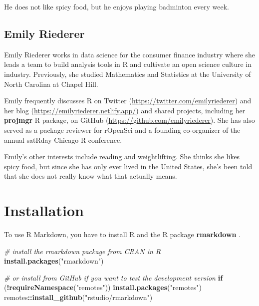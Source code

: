 \documentclass[
  11pt,
]{krantz}
\newenvironment{Shaded}{\begin{snugshade}}{\end{snugshade}}
\newcommand{\CommentTok}[1]{\textcolor[rgb]{0.37,0.37,0.37}{\textit{#1}}}
\newcommand{\ControlFlowTok}[1]{\textcolor[rgb]{0.27,0.27,0.27}{\textbf{#1}}}
\newcommand{\KeywordTok}[1]{\textcolor[rgb]{0.27,0.27,0.27}{\textbf{#1}}}
\newcommand{\NormalTok}[1]{#1}
\newcommand{\OperatorTok}[1]{\textcolor[rgb]{0.43,0.43,0.43}{\textbf{#1}}}
\newcommand{\StringTok}[1]{\textcolor[rgb]{0.5,0.5,0.5}{#1}}
\begin{document}
He does not like spicy food, but he enjoys playing badminton every week.

\hypertarget{emily-riederer}{%
\section*{Emily Riederer}\label{emily-riederer}}


Emily Riederer works in data science for the consumer finance industry where she leads a team to build analysis tools in R and cultivate an open science culture in industry. Previously, she studied Mathematics and Statistics at the University of North Carolina at Chapel Hill.

Emily frequently discusses R on Twitter (\url{https://twitter.com/emilyriederer}) and her blog (\url{https://emilyriederer.netlify.app/}) and shared projects, including her \textbf{projmgr} R package, on GitHub (\url{https://github.com/emilyriederer}). She has also served as a package reviewer for rOpenSci and a founding co-organizer of the annual satRday Chicago R conference.

Emily's other interests include reading and weightlifting. She thinks she likes spicy food, but since she has only ever lived in the United States, she's been told that she does not really know what that actually means.

\mainmatter

\hypertarget{installation}{%
\chapter{Installation}\label{installation}}

To use R Markdown, you have to install R \citep{R-base} and the R package \textbf{rmarkdown} \citep{R-rmarkdown}.

\begin{Shaded}
\begin{Highlighting}[]
\CommentTok{# install the rmarkdown package from CRAN in R}
\KeywordTok{install.packages}\NormalTok{(}\StringTok{"rmarkdown"}\NormalTok{)}

\CommentTok{# or install from GitHub if you want to test the development version}
\ControlFlowTok{if}\NormalTok{ (}\OperatorTok{!}\KeywordTok{requireNamespace}\NormalTok{(}\StringTok{"remotes"}\NormalTok{)) }\KeywordTok{install.packages}\NormalTok{(}\StringTok{"remotes"}\NormalTok{)}
\NormalTok{remotes}\OperatorTok{::}\KeywordTok{install_github}\NormalTok{(}\StringTok{"rstudio/rmarkdown"}\NormalTok{)}
\end{Highlighting}
\end{Shaded}
\end{document}
